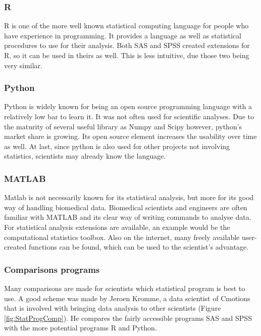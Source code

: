 \documentclass[10pt,a4paper]{article}
\begin{document}
	\subsubsection{R}
	
	R is one of the more well known statistical computing language for people who have experience in programming. It provides a language as well as statistical procedures to use for their analysis. Both SAS and SPSS created extensions for R, so it can be used in theirs as well. This is less intuitive, due those two being very similar. \cite{muenchen2011r}
	
	\subsubsection{Python}
	
	Python is widely known for being an open source programming language with a 
	relatively low bar to learn it. It was not often used for scientific 
	analyses. Due to the maturity of several useful library as Numpy and Scipy 
	however, python's market share is growing. Its open source element 
	increases the usability over time as well. At last, since python is also 
	used for other projects not involving statistics, scientists may already 
	know the language. 
	\cite{mckinney2010data}
	
	\subsubsection{MATLAB}
	
	Matlab is not necessarily known for its statistical analysis, but more for 
	its good way of handling biomedical data. Biomedical scientists and 
	engineers are often familiar with MATLAB and its clear way of writing 
	commands to analyse data. For statistical analysis extensions are 
	available, an example would be the computational statistics toolbox. Also 
	on the internet, many freely available user-created functions can be found, 
	which can be used to the scientist's advantage.
	\cite{martinez2007computational}
	
	\subsubsection{Comparisons programs}
	
	Many comparisons are made for scientists which statistical program is best 
	to use. A good scheme was made by Jeroen Kromme, a data scientist of 
	Cmotions that is involved with bringing data analysis to other scientists 
	(Figure \ref{fig:StatProgComp}). He compares the fairly accessible programs 
	SAS and SPSS with the more potential programs R and 
	Python.\cite{BlogKromme2017}
	
\end{document}
